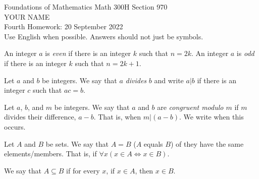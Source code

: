 \documentclass[12pt]{article}
\newcommand{\defcolor}[1]{{\color{blue}{#1}}}
\newcommand{\demph}[1]{{\color{blue}\sl{#1}}}
\begin{document}
\LARGE 
\noindent
{\color{Maroon}Foundations of Mathematics \hfill Math 300H Section 970}\vspace{2pt}\\
\Large YOUR NAME\vspace{2pt}\\
\large
Fourth Homework: \hfill 20 September 2022\\
Use English when possible.  Answers should not just be symbols.
\normalsize\medskip


\noindent{\color{blue}\rule{500pt}{2pt}}\medskip

 An integer $a$ is \demph{even} if there is an integer $k$ such that $n=2k$.
An integer $a$ is \demph{odd} if there is an integer $k$ such that $n=2k{+}1$.


 Let $a$ and $b$ be integers.
We say that $a$ \demph{divides} $b$ and write $a|b$ if there is an integer $c$ such that $ac=b$.



  Let $a$, $b$, and $m$ be integers.
We say that $a$ and $b$ are \demph{congruent modulo $m$} if $m$ divides their difference, $a-b$.
That is, when $m|(a-b)$.
We write \defcolor{$a\equiv b\mod m$} when this occurs.


Let $A$ and $B$ be sets.
We say that \demph{$A=B$} ($A$ equals $B$) of they have the same elements/members.
That is, if $\forall x (x\in A \Leftrightarrow x\in B)$.


We say that \demph{$A\subseteq B$} if for every $x$, if $x\in A$, then $x\in B$.\medskip


\noindent{\color{blue}\rule{500pt}{2pt}}\medskip
\end{document}

